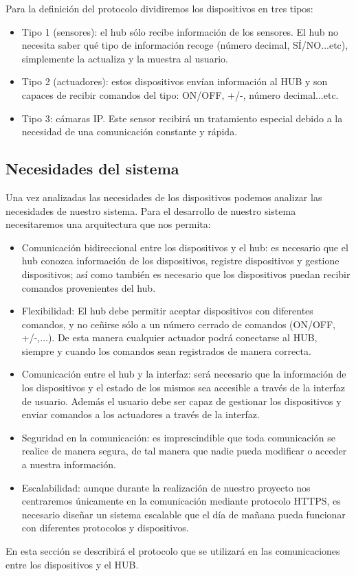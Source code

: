 Para la definición del protocolo dividiremos los dispositivos en tres tipos:
\begin{itemize}
\item Tipo 1 (sensores): el hub sólo recibe información de los sensores. El hub no necesita saber qué tipo de información recoge (número decimal, SÍ/NO...etc), simplemente la actualiza y la muestra al usuario.
\item Tipo 2 (actuadores): estos dispositivos envían información al HUB y son capaces de recibir comandos del tipo: ON/OFF, +/-, número decimal...etc.
\item Tipo 3: cámaras IP. Este sensor recibirá un tratamiento especial debido a la necesidad de una comunicación constante y rápida.
\end{itemize}
\subsection{Necesidades del sistema}
Una vez analizadas las necesidades de los dispositivos podemos analizar las necesidades de nuestro sistema.
Para el desarrollo de nuestro sistema necesitaremos una arquitectura que nos permita:
\begin{itemize}
\item Comunicación bidireccional entre los dispositivos y el hub: es necesario que el hub conozca información de los dispositivos, 
registre dispositivos y gestione dispositivos; así como también es necesario que los dispositivos puedan recibir comandos provenientes
del hub.
\item Flexibilidad: El hub debe permitir aceptar dispositivos con diferentes comandos, y no ceñirse sólo a un número cerrado de comandos (ON/OFF, +/-,...).
De esta manera cualquier actuador podrá conectarse al HUB, siempre y cuando los comandos sean registrados de manera correcta.
\item Comunicación entre el hub y la interfaz: será necesario que la información de los dispositivos y el estado de los mismos sea accesible
a través de la interfaz de usuario. Además el usuario debe ser capaz de gestionar los dispositivos y enviar comandos a los actuadores
a través de la interfaz.
\item Seguridad en la comunicación: es imprescindible que toda comunicación se realice de manera segura, de tal manera que nadie pueda modificar o
acceder a nuestra información.
\item Escalabilidad: aunque durante la realización de nuestro proyecto nos centraremos únicamente en la comunicación mediante protocolo HTTPS, 
es necesario diseñar un sistema escalable que el día de mañana pueda funcionar con diferentes protocolos y dispositivos.
\end{itemize}
En esta sección se describirá el protocolo que se utilizará en las comunicaciones entre los dispositivos y el HUB.
